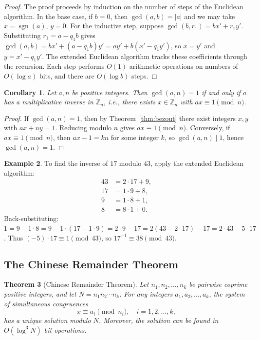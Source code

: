 \documentclass[twoside,12pt]{book}
\theoremstyle{plain}
\newtheorem{theorem}{Theorem}[chapter]
\newtheorem{corollary}[theorem]{Corollary}
\theoremstyle{definition}
\newtheorem{example}[theorem]{Example}
\theoremstyle{remark}
\begin{document}
\begin{proof}
The proof proceeds by induction on the number of steps of the Euclidean algorithm. In the base case, if $b = 0$, then $\gcd(a, b) = |a|$ and we may take $x = \operatorname{sgn}(a)$, $y = 0$. For the inductive step, suppose $\gcd(b, r_1) = bx' + r_1 y'$. Substituting $r_1 = a - q_1 b$ gives $\gcd(a, b) = bx' + (a - q_1 b)y' = ay' + b(x' - q_1 y')$, so $x = y'$ and $y = x' - q_1 y'$. The extended Euclidean algorithm tracks these coefficients through the recursion. Each step performs $O(1)$ arithmetic operations on numbers of $O(\log a)$ bits, and there are $O(\log b)$ steps.
\end{proof}

\begin{corollary}
\label{cor:inverse}
Let $a, n$ be positive integers. Then $\gcd(a, n) = 1$ if and only if $a$ has a multiplicative inverse in $\mathbb{Z}_n$, i.e., there exists $x \in \mathbb{Z}_n$ with $ax \equiv 1 \pmod{n}$.
\end{corollary}

\begin{proof}
If $\gcd(a, n) = 1$, then by Theorem~\ref{thm:bezout} there exist integers $x, y$ with $ax + ny = 1$. Reducing modulo $n$ gives $ax \equiv 1 \pmod{n}$. Conversely, if $ax \equiv 1 \pmod{n}$, then $ax - 1 = kn$ for some integer $k$, so $\gcd(a, n) \mid 1$, hence $\gcd(a, n) = 1$.
\end{proof}

\begin{example}
To find the inverse of $17$ modulo $43$, apply the extended Euclidean algorithm:
\begin{align*}
43 &= 2 \cdot 17 + 9, \\
17 &= 1 \cdot 9 + 8, \\
9 &= 1 \cdot 8 + 1, \\
8 &= 8 \cdot 1 + 0.
\end{align*}
Back-substituting: $1 = 9 - 1 \cdot 8 = 9 - 1 \cdot (17 - 1 \cdot 9) = 2 \cdot 9 - 17 = 2(43 - 2 \cdot 17) - 17 = 2 \cdot 43 - 5 \cdot 17$. Thus $(-5) \cdot 17 \equiv 1 \pmod{43}$, so $17^{-1} \equiv 38 \pmod{43}$.
\end{example}

\subsection{The Chinese Remainder Theorem}

\begin{theorem}[Chinese Remainder Theorem]
\label{thm:crt}
Let $n_1, n_2, \ldots, n_k$ be pairwise coprime positive integers, and let $N = n_1 n_2 \cdots n_k$. For any integers $a_1, a_2, \ldots, a_k$, the system of simultaneous congruences
\[
x \equiv a_i \pmod{n_i}, \quad i = 1, 2, \ldots, k,
\]
has a unique solution modulo $N$. Moreover, the solution can be found in $O(\log^3 N)$ bit operations.
\end{theorem}
\end{document}
